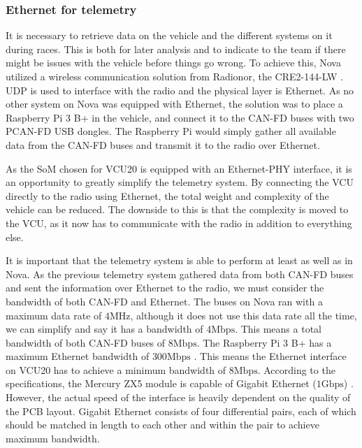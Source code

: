

\subsubsection{Ethernet for telemetry}

It is necessary to retrieve data on the vehicle and the different systems on it during races. This is both for later analysis and to indicate to the team if there might be issues with the vehicle before things go wrong. To achieve this, Nova utilized a wireless communication solution from Radionor, the CRE2-144-LW \cite{radionor}. UDP is used to interface with the radio and the physical layer is Ethernet. As no other system on Nova was equipped with Ethernet, the solution was to place a Raspberry Pi 3 B+ in the vehicle, and connect it to the CAN-FD buses with two PCAN-FD USB dongles. The Raspberry Pi would simply gather all available data from the CAN-FD buses and transmit it to the radio over Ethernet. 

As the SoM chosen for VCU20 is equipped with an Ethernet-PHY interface, it is an opportunity to greatly simplify the telemetry system. By connecting the VCU directly to the radio using Ethernet, the total weight and complexity of the vehicle can be reduced. The downside to this is that the complexity is moved to the VCU, as it now has to communicate with the radio in addition to everything else. 

It is important that the telemetry system is able to perform at least as well as in Nova. As the previous telemetry system gathered data from both CAN-FD buses and sent the information over Ethernet to the radio, we must consider the bandwidth of both CAN-FD and Ethernet. The buses on Nova ran with a maximum data rate of $4\si{\mega\hertz}$, although it does not use this data rate all the time, we can simplify and say it has a bandwidth of $4\textrm{Mbps}$. This means a total bandwidth of both CAN-FD buses of $8\textrm{Mbps}$. The Raspberry Pi 3 B+ has a maximum Ethernet bandwidth of $300\textrm{Mbps}$ \cite{rpi}. This means the Ethernet interface on VCU20 has to achieve a minimum bandwidth of $8\textrm{Mbps}$. According to the specifications, the Mercury ZX5 module is capable of Gigabit Ethernet ($1 \textrm{Gbps}$) \cite{zx5}. However, the actual speed of the interface is heavily dependent on the quality of the PCB layout. Gigabit Ethernet consists of four differential pairs, each of which should be matched in length to each other and within the pair to achieve maximum bandwidth.

